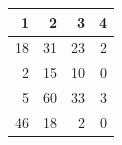 \begin{tabular}{rrrr}
\toprule
1 & 2 & 3 & 4 \\
\midrule
18 & 31 & 23 & 2 \\
2 & 15 & 10 & 0 \\
5 & 60 & 33 & 3 \\
46 & 18 & 2 & 0 \\
\bottomrule
\end{tabular}

